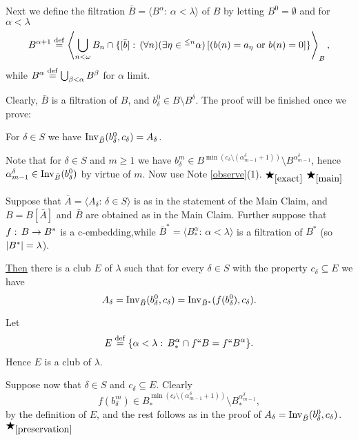 \begin{Proof}
\begin{Proof of the Main Claim}
Next we define the filtration $\bar{B}=\langle B^\alpha:\,\alpha<\lambda\rangle$
of $B$ by letting $B^0=\emptyset$ and for $\alpha<\lambda$
\[
B^{\alpha+1}\deq\left\langle \bigcup_{n<\omega} B_n\cap\{[\bar{b}]:\,(\forall n)
(\exists \eta\in {}^{\le n}\alpha)\,[(b(n)=a_\eta\mbox{ or } b(n)=0]\}
\right\rangle_B,
\]
while $B^\alpha\deq\bigcup_{\beta<\alpha}B^\beta$ for $\alpha$ limit.

Clearly, $\bar{B}$ is a filtration of $B$, and
$b^0_\delta\in B\setminus B^\delta$. The proof will be finished
once we prove:

\begin{Subclaim}\label{exact}
For $\delta\in S$ we have ${\rm Inv}_{\bar{B}}(b^0_{\delta},
c_\delta)=A_\delta$.
\end{Subclaim}

\begin{Proof of the Subclaim} Note that for $\delta\in S$ and $m\ge 1$
we have
$b^m_\delta\in B^{\min(c_\delta\setminus (\alpha^\delta_{m-1}+1))}
\setminus B^{\alpha^\delta_{m-1}}$, hence
$\alpha^\delta_{m-1}\in {\rm Inv}_{\bar{B}}(b_\delta^0)$ by virtue of $m$.
Now use Note \ref{observe}(1).
$\bigstar_{\ref{exact}}$ $\bigstar_{\ref{main}}$
\end{Proof of the Subclaim}
\end{Proof of the Main Claim}

\begin{Claim}\label{preservation} Suppose that $\bar{A}=\langle A_\delta:\,\delta
\in S\rangle$ is as in the statement of the Main Claim, and $B=B[\bar{A}]$ and
$\bar{B}$ are obtained as in the Main Claim. Further
suppose that $f:\,B\rightarrow B^\ast$ is a
c-embedding,while
$\bar{B}^\ast=\langle B^\alpha_\ast:\,\alpha<\lambda\rangle$
is a filtration of $B^\ast$ (so ${\vert B^\ast \vert}=\lambda$).

\underline{Then} there is a club $E$ of $\lambda$ such that for every
$\delta\in S$ with the property $c_\delta\subseteq E$
we have
\[
A_\delta={\rm Inv}_{\bar{B}}(b^0_\delta,c_\delta)={\rm Inv}_{\bar{B}^\ast}(
f(b^0_\delta),c_\delta).
\]
\end{Claim}

\begin{Proof of the Claim} Let
\[
E\deq\{\alpha<\lambda:\,
B_\ast^\alpha\cap f``B=f``B^\alpha\}.
\]
Hence $E$ is a club of $\lambda$.

Suppose now that $\delta\in S$ and $c_\delta\subseteq E$. Clearly
\[
f(b^m_\delta)\in B^{\min(c_\delta\setminus (\alpha^\delta_{m-1}+1))}_\ast
\setminus B^{\alpha^\delta_{m-1}}_\ast,
\]
by the definition of $E$,
and the rest follows as in the proof of $A_\delta=
{\rm Inv}_{\bar{B}}(b^0_\delta,c_\delta)$.
$\bigstar_{\ref{preservation}}$
\end{Proof of the Claim}


\end{Proof}

